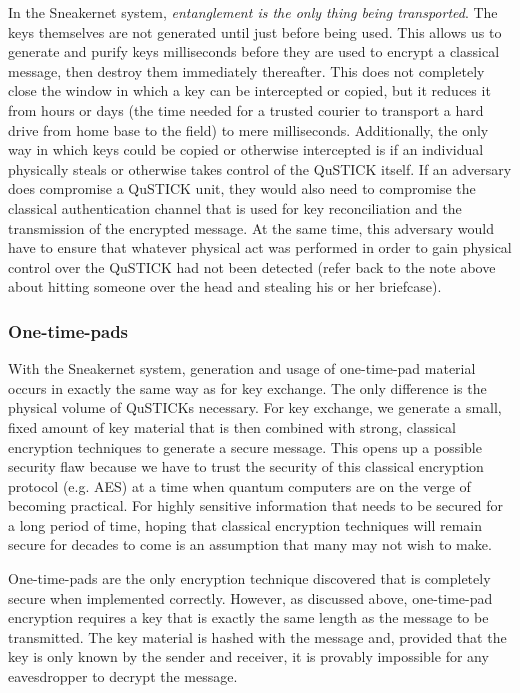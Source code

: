 \documentclass[twocolumn, aps, rmp, amsmath, amssymb, nofootinbib, superscriptaddress, longbibliography, floatfix, table-of-contents, eqsecnum]{revtex4-2}
\begin{document}
In the Sneakernet system, \textit{entanglement is the only thing being transported}. The keys themselves are not generated until just before being used. This allows us to generate and purify keys milliseconds before they are used to encrypt a classical message, then destroy them immediately thereafter. This does not completely close the window in which a key can be intercepted or copied, but it reduces it from hours or days (the time needed for a trusted courier to transport a hard drive from home base to the field) to mere milliseconds. Additionally, the only way in which keys could be copied or otherwise intercepted is if an individual physically steals or otherwise takes control of the QuSTICK itself. If an adversary does compromise a QuSTICK unit, they would also need to compromise the classical authentication channel that is used for key reconciliation and the transmission of the encrypted message. At the same time, this adversary would have to ensure that whatever physical act was performed in order to gain physical control over the QuSTICK had not been detected (refer back to the note above about hitting someone over the head and stealing his or her briefcase). 

\subsubsection{One-time-pads}

With the Sneakernet system, generation and usage of one-time-pad material occurs in exactly the same way as for key exchange. The only difference is the physical volume of QuSTICKs necessary. For key exchange, we generate a small, fixed amount of key material that is then combined with strong, classical encryption techniques to generate a secure message. This opens up a possible security flaw because we have to trust the security of this classical encryption protocol (e.g. AES) at a time when quantum computers are on the verge of becoming practical. For highly sensitive information that needs to be secured for a long period of time, hoping that classical encryption techniques will remain secure for decades to come is an assumption that many may not wish to make. 

One-time-pads are the only encryption technique discovered that is completely secure when implemented correctly. However, as discussed above, one-time-pad encryption requires a key that is exactly the same length as the message to be transmitted. The key material is hashed with the message and, provided that the key is only known by the sender and receiver, it is provably impossible for any eavesdropper to decrypt the message. 
\end{document}
